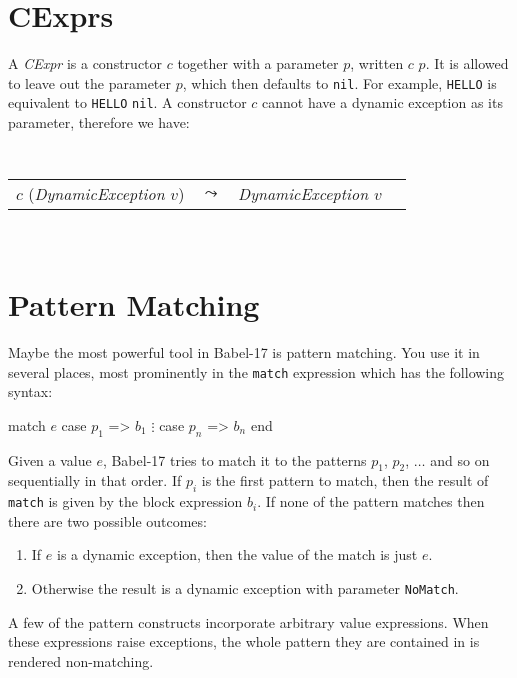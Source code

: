 \documentclass[11pt]{amsart}
\newcommand{\metababel}[1] {\textsl{#1}}
\newenvironment{babelcode}[0]{\begin{center}\tt}{\end{center}}
\newcommand{\babelsrc}[1] {\lstinline!#1!}
\begin{document}
\section{CExprs}
A \metababel{CExpr} is a constructor $c$ together with a parameter $p$, written $c$ $p$. It is allowed to leave out the parameter $p$, which then defaults to \babelsrc{nil}. For example,  \babelsrc{HELLO} is equivalent to \babelsrc{HELLO} \babelsrc{nil}. A constructor $c$ cannot have a dynamic exception as its parameter, therefore we have:
\begin{babelcode}
\begin{tabular}{rcll}
$c$ (\metababel{DynamicException $v$}) & $\leadsto$ & \metababel{DynamicException $v$}&\\
\end{tabular}\\
\end{babelcode}

\section{Pattern Matching}
Maybe the most powerful tool in Babel-17 is pattern matching. You use it in several places, most prominently in the \babelsrc{match} expression which has the following syntax:
\begin{babellisting}
match $e$ 
  case $p_1$ => $b_1$
  $\vdots$
  case $p_n$ => $b_n$
end  
\end{babellisting}
Given a value $e$, Babel-17 tries to match it to the patterns $p_1$, $p_2$, $\ldots$ and so on sequentially in that order. If $p_i$ is the first pattern to match, then the result of \babelsrc{match} 
is given by the block expression $b_i$. If none of the pattern matches then there are two possible outcomes:
\begin{enumerate}
\item If $e$ is a dynamic exception, then the value of the match is just $e$.
\item Otherwise the result is a dynamic exception with parameter \babelsrc{NoMatch}.
\end{enumerate}
A few of the pattern constructs  incorporate arbitrary value expressions. When these expressions raise exceptions, the whole pattern they are contained in is rendered non-matching.
\end{document}
